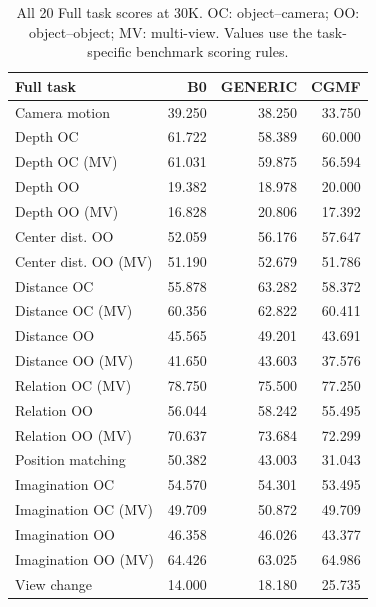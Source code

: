 \begin{table}[t]
\centering\small
\begin{tabular}{@{}lrrr@{}}
\toprule
Full task & B0 & GENERIC & CGMF \\
\midrule
Camera motion & 39.250 & 38.250 & 33.750 \\
Depth OC & 61.722 & 58.389 & 60.000 \\
Depth OC (MV) & 61.031 & 59.875 & 56.594 \\
Depth OO & 19.382 & 18.978 & 20.000 \\
Depth OO (MV) & 16.828 & 20.806 & 17.392 \\
Center dist. OO & 52.059 & 56.176 & 57.647 \\
Center dist. OO (MV) & 51.190 & 52.679 & 51.786 \\
Distance OC & 55.878 & 63.282 & 58.372 \\
Distance OC (MV) & 60.356 & 62.822 & 60.411 \\
Distance OO & 45.565 & 49.201 & 43.691 \\
Distance OO (MV) & 41.650 & 43.603 & 37.576 \\
Relation OC (MV) & 78.750 & 75.500 & 77.250 \\
Relation OO & 56.044 & 58.242 & 55.495 \\
Relation OO (MV) & 70.637 & 73.684 & 72.299 \\
Position matching & 50.382 & 43.003 & 31.043 \\
Imagination OC & 54.570 & 54.301 & 53.495 \\
Imagination OC (MV) & 49.709 & 50.872 & 49.709 \\
Imagination OO & 46.358 & 46.026 & 43.377 \\
Imagination OO (MV) & 64.426 & 63.025 & 64.986 \\
View change & 14.000 & 18.180 & 25.735 \\
\bottomrule
\end{tabular}
\caption{All 20 Full task scores at 30K. OC: object--camera; OO: object--object; MV: multi-view. Values use the task-specific benchmark scoring rules.}
\label{tab:tasks}
\end{table}
